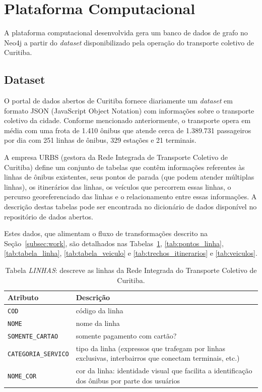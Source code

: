 \section{Plataforma Computacional} \label{sec:impl}

A plataforma computacional desenvolvida gera um banco de dados de grafo no Neo4j a partir do \emph{dataset} disponibilizado pela operação do transporte coletivo de Curitiba.


\subsection{Dataset}

 
O portal de dados abertos de Curitiba fornece diariamente um \emph{dataset} em formato JSON (JavaScript Object Notation) com informações sobre o transporte coletivo da cidade. Conforme mencionado anteriormente, o transporte opera em média com uma frota de 1.410 ônibus que atende cerca de 1.389.731 passageiros por dia com 251 linhas de ônibus, 329 estações e 21 terminais.

A empresa URBS (gestora da Rede Integrada de Transporte Coletivo de Curitiba) define um conjunto de tabelas que contêm informações referentes às linhas de ônibus existentes, seus pontos de parada (que podem atender múltiplas linhas), os itinerários das linhas, os veículos que percorrem essas linhas, o percurso georeferenciado das linhas e o relacionamento entre essas informações. A descrição destas tabelas pode ser encontrada no dicionário de dados disponível no repositório de dados abertos. 

Estes dados, que alimentam o fluxo de transformações descrito na Seção~\ref{subsec:work}, são detalhados nas Tabelas~\ref{tab:linhas}, \ref{tab:pontos_linha},  \ref{tab:tabela_linha},  \ref{tab:tabela_veiculo} e \ref{tab:trechos_itinerarios} e  \ref{tab:veiculos}.

\begin{table}[htb]
    \caption{Tabela \emph{LINHAS}: descreve as linhas da Rede Integrada do Transporte Coletivo de Curitiba.}
    \centering
    \begin{tabular}{ p{5cm}p{9cm}} 
        \hline
        Atributo & Descrição\\
        \hline
         
        \texttt{COD} & código da linha   \\
        \texttt{NOME} & nome da linha   \\
        \texttt{SOMENTE\_CARTAO} & somente pagamento com cartão? \\
        \texttt{CATEGORIA\_SERVICO} & tipo da linha (expressos que trafegam por linhas exclusivas, interbairros que conectam terminais, etc.)  \\
        \texttt{NOME\_COR} & cor da linha: identidade visual que facilita a identificação dos ônibus por parte dos usuários \\ 
        \hline
        \end{tabular}
    \label{tab:linhas}
\end{table}

